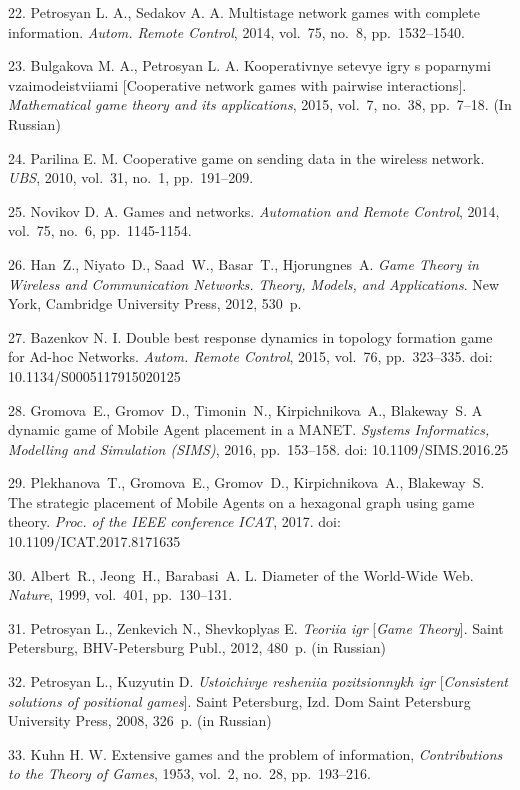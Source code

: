 {22. Petrosyan L. A., Sedakov A. A. Multistage network games with
complete information. {\em Autom. Remote Control}, 2014, vol.~75,
no.~8, pp.~1532--1540.

23. Bulgakova M. A., Petrosyan L. A. Kooperativnye setevye igry s
poparnymi vzaimodeistviiami [Cooperative network games with
pairwise interactions]. {\em Mathematical game theory and its
applications}, 2015, vol.~7,  no.~38, pp.~7--18. (In Russian)

24. Parilina E. M. Cooperative game on sending data in the
wireless network.  {\em UBS}, 2010,  vol.~31, no.~1, pp.~191--209.

25. Novikov D. A. Games and networks.  {\em Automation and Remote
Control}, 2014, vol.~75, no.~6, pp.~1145-1154.

26. Han~Z., Niyato~D., Saad~W., Basar~T., Hjorungnes~A. {\em Game
Theory in Wireless and Communication Networks. Theory, Models, and
Applications}. New York, Cambridge University Press, 2012, 530~p.

27. Bazenkov N. I. Double best response dynamics in topology
formation game for Ad-hoc Networks. {\em Autom. Remote Control},
2015, vol.~76, pp.~323--335. doi: 10.1134/S0005117915020125


28. Gromova~E., Gromov~D., Timonin~N., Kirpichnikova~A.,
Blakeway~S. A dynamic game of Mobile Agent placement in a MANET.
{\em Systems Informatics, Modelling and Simulation (SIMS)}, 2016,
pp.~153--158. doi: 10.1109/SIMS.2016.25

29. Plekhanova~T., Gromova~E., Gromov~D., Kirpichnikova~A.,
Blakeway~S.  The strategic placement of Mobile Agents on a
hexagonal graph using game theory. {\em Proc. of the IEEE
conference ICAT}, 2017. doi: 10.1109/ICAT.2017.8171635

30. Albert~R., Jeong~H., Barabasi~A. L. Diameter of the World-Wide
Web. {\em Nature}, 1999, vol.~401, pp.~130--131.

31. Petrosyan L., Zenkevich N., Shevkoplyas E.  {\it Teoriia igr}
[\textit{Game Theory}]. Saint Petersburg, BHV-Petersburg Publ.,
2012, 480~p. (in Russian)

32. Petrosyan L., Kuzyutin D.  {\it Ustoichivye resheniia
pozitsionnykh igr} [{\em Consistent solutions of positional
games}]. Saint Petersburg, Izd. Dom Saint Petersburg University
Press, 2008, 326~p. (in Russian)

33. Kuhn H. W. Extensive games and the problem of information,
{\it Contributions to the Theory of Games}, 1953, vol.~2, no.~28,
pp.~193--216.

}
